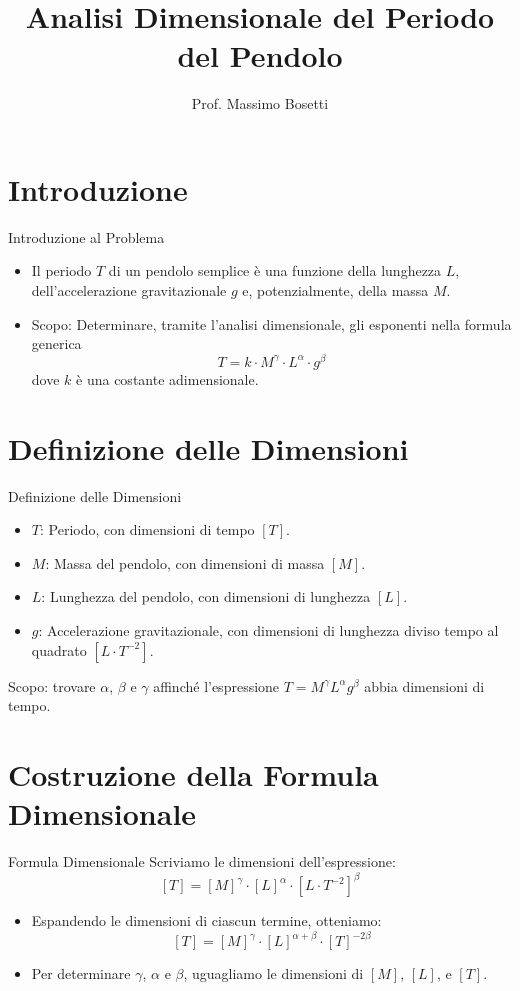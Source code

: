 \documentclass{beamer}
\title{Analisi Dimensionale del Periodo del Pendolo}
\subtitle{}
\author{Prof. Massimo Bosetti}
\institute{Liceo da Vinci}
\date{}
\begin{document}
\begin{frame}
    \titlepage
\end{frame}
\section{Introduzione}

\begin{frame}{Introduzione al Problema}
    \begin{itemize}
        \item Il periodo $ T $ di un pendolo semplice è una funzione della lunghezza $ L $, dell'accelerazione gravitazionale $ g $ e, potenzialmente, della massa $ M $.
        \item Scopo: Determinare, tramite l'analisi dimensionale, gli esponenti nella formula generica
        $$ T = k \cdot M^\gamma \cdot L^\alpha \cdot g^\beta $$
        dove $ k $ è una costante adimensionale.
    \end{itemize}
\end{frame}

\section{Definizione delle Dimensioni}

\begin{frame}{Definizione delle Dimensioni}
    \begin{itemize}
        \item $ T $: Periodo, con dimensioni di tempo $[T]$.
        \item $ M $: Massa del pendolo, con dimensioni di massa $[M]$.
        \item $ L $: Lunghezza del pendolo, con dimensioni di lunghezza $[L]$.
        \item $ g $: Accelerazione gravitazionale, con dimensioni di lunghezza diviso tempo al quadrato $[L \cdot T^{-2}]$.
    \end{itemize}
    \centering
    Scopo: trovare $\alpha$, $\beta$ e $\gamma$ affinché l'espressione $ T = M^\gamma L^\alpha g^\beta $ abbia dimensioni di tempo.
\end{frame}

\section{Costruzione della Formula Dimensionale}

\begin{frame}{Formula Dimensionale}
    Scriviamo le dimensioni dell'espressione:
    $$ [T] = [M]^\gamma \cdot [L]^\alpha \cdot [L \cdot T^{-2}]^\beta $$
    \begin{itemize}
        \item Espandendo le dimensioni di ciascun termine, otteniamo:
        $$ [T] = [M]^\gamma \cdot [L]^{\alpha + \beta} \cdot [T]^{-2\beta} $$
    \item Per determinare $\gamma$, $\alpha$ e $\beta$, uguagliamo le dimensioni di $ [M] $, $ [L] $, e $ [T] $.
    \end{itemize}
\end{frame}
\end{document}
